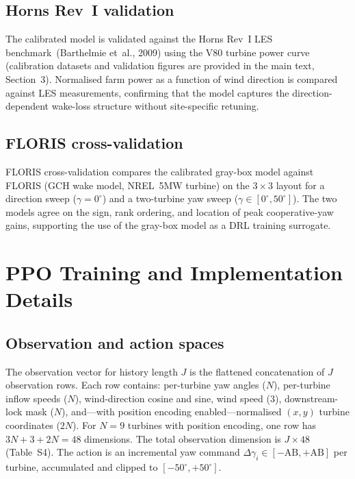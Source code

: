 \documentclass{article}
\begin{document}
\subsection{Horns Rev~I validation}

The calibrated model is validated against the Horns Rev~I LES benchmark~(Barthelmie et~al., 2009) using the V80 turbine power curve (calibration datasets and validation figures are provided in the main text, Section~3). Normalised farm power as a function of wind direction is compared against LES measurements, confirming that the model captures the direction-dependent wake-loss structure without site-specific retuning.

\subsection{FLORIS cross-validation}

FLORIS cross-validation compares the calibrated gray-box model against FLORIS (GCH wake model, NREL~5MW turbine) on the $3{\times}3$ layout for a direction sweep ($\gamma{=}0^\circ$) and a two-turbine yaw sweep ($\gamma{\in}[0^\circ,50^\circ]$). The two models agree on the sign, rank ordering, and location of peak cooperative-yaw gains, supporting the use of the gray-box model as a DRL training surrogate.

\section{PPO Training and Implementation Details}\label{sec:ppo_impl}

\subsection{Observation and action spaces}

The observation vector for history length $J$ is the flattened concatenation of $J$ observation rows. Each row contains: per-turbine yaw angles ($N$), per-turbine inflow speeds ($N$), wind-direction cosine and sine, wind speed ($3$), downstream-lock mask ($N$), and---with position encoding enabled---normalised $(x,y)$ turbine coordinates ($2N$). For $N{=}9$ turbines with position encoding, one row has $3N{+}3{+}2N{=}48$ dimensions. The total observation dimension is $J \times 48$ (Table~S4). The action is an incremental yaw command $\Delta\gamma_i \in [-\mathrm{AB}, +\mathrm{AB}]$ per turbine, accumulated and clipped to $[-50^\circ, +50^\circ]$.
\end{document}
